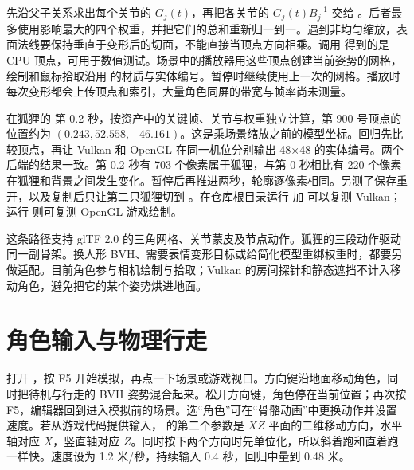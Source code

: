  先沿父子关系求出每个关节的 $G_j(t)$，再把各关节的 $G_j(t)B_j^{-1}$ 交给 。后者最多使用影响最大的四个权重，并把它们的总和重新归一到一。遇到非均匀缩放，表面法线要保持垂直于变形后的切面，不能直接当顶点方向相乘。调用  得到的是 CPU 顶点，可用于数值测试。场景中的播放器用这些顶点创建当前姿势的网格，绘制和鼠标拾取沿用  的材质与实体编号。暂停时继续使用上一次的网格。播放时每次变形都会上传顶点和索引，大量角色同屏的带宽与帧率尚未测量。

在狐狸的  第 0.2 秒，按资产中的关键帧、关节与权重独立计算，第 900 号顶点的位置约为 $(0.243,52.558,-46.161)$。这是乘场景缩放之前的模型坐标。回归先比较顶点，再让 Vulkan 和 OpenGL 在同一机位分别输出 48×48 的实体编号。两个后端的结果一致。第 0.2 秒有 703 个像素属于狐狸，与第 0 秒相比有 220 个像素在狐狸和背景之间发生变化。暂停后再推进两秒，轮廓逐像素相同。另测了保存重开，以及复制后只让第二只狐狸切到 。在仓库根目录运行  加  可以复测 Vulkan；运行  则可复测 OpenGL 游戏绘制。

这条路径支持 glTF 2.0 的三角网格、关节蒙皮及节点动作。狐狸的三段动作驱动同一副骨架。换人形 BVH、需要表情变形目标或给简化模型重绑权重时，都要另做适配。目前角色参与相机绘制与拾取；Vulkan 的房间探针和静态遮挡不计入移动角色，避免把它的某个姿势烘进地面。


\clearpage
\section{角色输入与物理行走}
打开 ，按 F5 开始模拟，再点一下场景或游戏视口。方向键沿地面移动角色，同时把待机与行走的 BVH 姿势混合起来。松开方向键，角色停在当前位置；再次按 F5，编辑器回到进入模拟前的场景。选“角色”可在“骨骼动画”中更换动作并设置速度。若从游戏代码提供输入， 的第二个参数是 $XZ$ 平面的二维移动方向，水平轴对应 $X$，竖直轴对应 $Z$。同时按下两个方向时先单位化，所以斜着跑和直着跑一样快。速度设为 1.2 米/秒，持续输入 0.4 秒，回归中量到 0.48 米。

